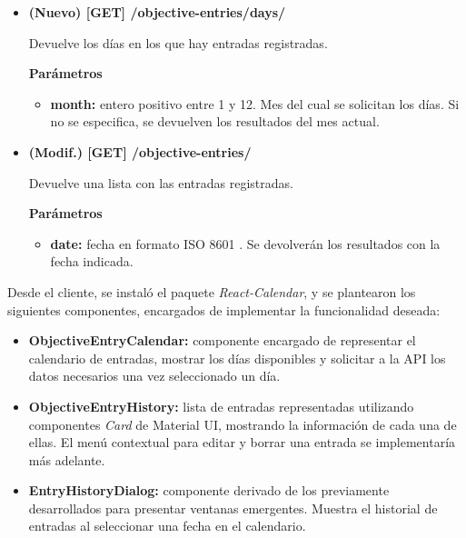 \documentclass[10pt, a4paper]{aqademic}
\begin{document}
\begin{itemize}
	\item \textbf{(Nuevo) [GET] /objective-entries/days/} 
	
	Devuelve los días en los que hay entradas registradas.
	
	\textbf{Parámetros}
	
	\begin{itemize}
		\item \textbf{month:} entero positivo entre 1 y 12. Mes del cual se solicitan los días. Si no se especifica, se devuelven los resultados del mes actual.
	\end{itemize}

	\item \textbf{(Modif.) [GET] /objective-entries/} 
	
	Devuelve una lista con las entradas registradas.

	\textbf{Parámetros}
	
	\begin{itemize}
		\item \textbf{date:} fecha en formato ISO 8601 \cite{houston1993iso}. Se devolverán los resultados con la fecha indicada.
	\end{itemize}
\end{itemize}

\medskip

Desde el cliente, se instaló el paquete \textit{React-Calendar}, y se plantearon los siguientes componentes, encargados de implementar la funcionalidad deseada:

\begin{itemize}
	\item \textbf{ObjectiveEntryCalendar:} componente encargado de representar el calendario de entradas, mostrar los días disponibles y solicitar a la API los datos necesarios una vez seleccionado un día.
	
	\item \textbf{ObjectiveEntryHistory:} lista de entradas representadas utilizando componentes \textit{Card} de Material UI, mostrando la información de cada una de ellas. El menú contextual para editar y borrar una entrada se implementaría más adelante.
	
	\item \textbf{EntryHistoryDialog:} componente derivado de los previamente desarrollados para presentar ventanas emergentes. Muestra el historial de entradas al seleccionar una fecha en el calendario.
\end{itemize}
\end{document}
